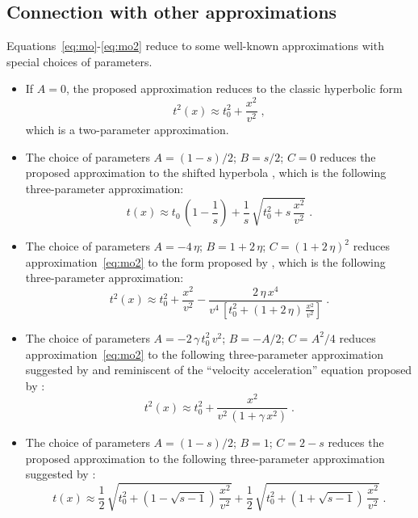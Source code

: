 \subsection{Connection with other approximations}

Equations~\ref{eq:mo}-\ref{eq:mo2} reduce to some well-known
approximations with special choices of parameters.
\begin{itemize}

\item If $A=0$, the proposed approximation reduces to
the classic hyperbolic form
\begin{equation}
\label{eq:hyper}
t^2(x) \approx t_0^2 + \frac{x^2}{v^2}\;,
\end{equation}
which is a two-parameter approximation.

\item The choice of parameters $A=(1-s)/2$; $B=s/2$; $C=0$ reduces the proposed
approximation to the shifted hyperbola \cite[]{malovichko,GEO53-02-01430157,GEO59-06-09830999}, which is the following three-parameter
approximation:
\begin{equation}
\label{eq:shifted}
t(x) \approx t_0\,\left(1-\frac{1}{s}\right) + 
\frac{1}{s}\,\sqrt{t_0^2+s\,\frac{x^2}{v^2}}\;.
\end{equation}

\item The choice of parameters $A = - 4\,\eta$; $B = 1 + 2\,\eta$;
  $C=(1 + 2\,\eta)^2$ reduces approximation~\ref{eq:mo2} to the form
  proposed by \cite{GEO60-05-15501566} , which is the following
  three-parameter approximation:
\begin{equation}
  \label{eq:tsvankin}
  t^2(x) \approx t_0^2 + \frac{x^2}{v^2} - 
  \frac{2\,\eta\,x^4}
  {\displaystyle v^4\,\left[t_0^2 + (1+2\,\eta)\,\frac{x^2}{v^2}\right]}\;.
\end{equation}

\item The choice of parameters $A = - 2\,\gamma\,t_0^2\,v^2$; $B =
  -A/2$; $C=A^2/4$ reduces approximation~\ref{eq:mo2} to the following
  three-parameter approximation suggested by \cite{blias2} and
  reminiscent of the ``velocity acceleration'' equation proposed by
  \cite{taner1,taner2}:
  \begin{equation}
    \label{eq:taner}
    t^2(x) \approx t_0^2 + \frac{x^2}{v^2\,(1+\gamma\,x^2)}\;.
  \end{equation}
  
\item The choice of parameters $A=(1-s)/2$; $B=1$; $C=2-s$ reduces the proposed approximation to the following 
  three-parameter approximation suggested by \cite{blias}:
  \begin{equation}
    \label{eq:blias}
    t(x) \approx 
    \frac{1}{2}\,\sqrt{t_0^2+\left(1-\sqrt{s-1}\right)\,\frac{x^2}{v^2}} +
    \frac{1}{2}\,\sqrt{t_0^2+\left(1+\sqrt{s-1}\right)\,\frac{x^2}{v^2}} \;.
  \end{equation}
  

\end{itemize}
